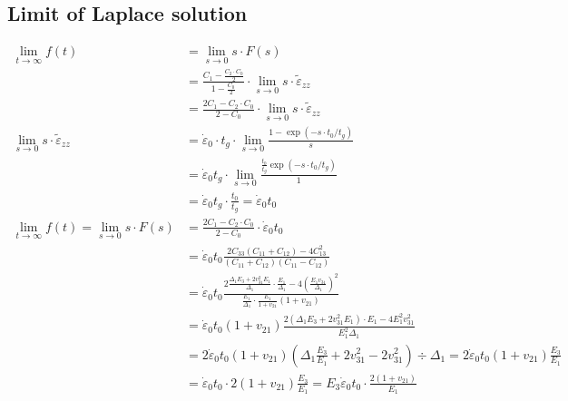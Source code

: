 \documentclass{article}
\begin{document}
\subsection{Limit of Laplace solution}

\begin{align}
\lim _{t \rightarrow \infty} f(t)&=\lim _{s \rightarrow 0} s \cdot F(s) \\
&=\frac{C_{1}-\frac{C_{2} \cdot C_{0}}{2}}{1-\frac{C_{0}}{2}} \cdot \lim _{s \rightarrow 0} s \cdot \tilde{\varepsilon}_{z z}\\ 
&=\frac{2 C_{1}-C_{2} \cdot C_{0}}{2-C_{0}} \cdot \lim _{s \rightarrow 0} s \cdot \tilde{\varepsilon}_{z z} \\
\lim _{s \rightarrow 0} s \cdot \tilde{\varepsilon}_{z z}&=\dot{\varepsilon}_{0} \cdot t_{g} \cdot \lim _{s \rightarrow 0} \frac{1-\exp \left(-s \cdot t_{0} / t_{g}\right)}{s} \\
&=\dot{\varepsilon}_{0} t_{g} \cdot \lim _{s \rightarrow 0} \frac{\frac{t_{0}}{t_{g}} \exp \left(-s \cdot t_{0} / t_{g}\right)}{1} \\
&=\dot{\varepsilon}_{0} t_{g} \cdot \frac{t_{0}}{t_{g}}=\dot{\varepsilon}_{0} t_{0} \\
%
\lim _{t \rightarrow \infty} f(t)=\lim _{s \rightarrow 0} s \cdot F(s)&=  \frac{2 C_{1}-C_{2} \cdot C_{0}}{2-C_{0}} \cdot \dot{\varepsilon}_{0} t_{0} \\
&=\dot{\varepsilon}_{0} t_{0} \frac{2 C_{33}\left(C_{11}+C_{12}\right)-4 C_{13}^{2}}{\left(C_{11}+C_{12}\right)\left(C_{11}-C_{12}\right)} \\
&=\dot{\varepsilon}_{0} t_{0} \frac{2 \frac{\Delta_{1} E_{3}+2 v_{31}^{2} E_{1}}{\Delta_{1}} \cdot \frac{E_{1}}{\Delta_{1}}-4\left(\frac{E_{1} v_{31}}{\Delta_{1}}\right)^{2}}{\frac{E_{1}}{\Delta_{1}} \cdot \frac{E_{1}}{1+v_{21}}\left(1+v_{21}\right)} \\
&=\dot{\varepsilon}_{0} t_{0}\left(1+v_{21}\right) \frac{2\left(\Delta_{1} E_{3}+2 v_{31}^{2} E_{1}\right) \cdot E_{1}-4 E_{1}^{2} v_{31}^{2}}{E_{1}^{2} \Delta_{1}} \\
&=2 \dot{\varepsilon}_{0} t_{0}\left(1+v_{21}\right)\left(\Delta_{1} \frac{E_{3}}{E_{1}}+2 v_{31}^{2}-2 v_{31}^{2}\right) \div \Delta_{1}=2 \dot{\varepsilon}_{0} t_{0}\left(1+v_{21}\right) \frac{E_{3}}{E_{1}} \\
&=\dot{\varepsilon}_{0} t_{0} \cdot 2\left(1+v_{21}\right) \frac{E_{3}}{E_{1}}=E_{3} \dot{\varepsilon}_{0} t_{0} \cdot \frac{2\left(1+v_{21}\right)}{E_{1}}
\end{align}
\end{document}
